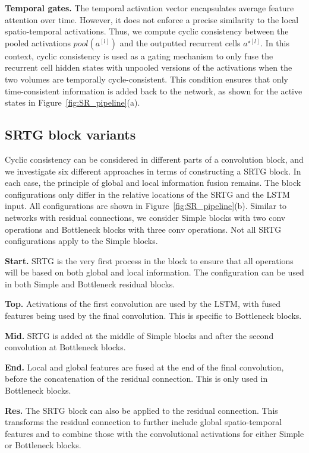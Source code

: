 \documentclass[final,5p,times,twocolumn]{elsarticle}
\begin{document}
\textbf{Temporal gates.} The temporal activation vector encapsulates average feature attention over time. However, it does not enforce a precise similarity to the local spatio-temporal activations. Thus, we compute cyclic consistency between the pooled activations $pool(a^{[l]})$ and the outputted recurrent cells $a^{\star[l]}$. In this context, cyclic consistency is used as a gating mechanism to only fuse the recurrent cell hidden states with unpooled versions of the activations when the two volumes are temporally cycle-consistent. This condition ensures that only time-consistent information is added back to the network, as shown for the active states in Figure~\ref{fig:SR_pipeline}(a).


\subsection{SRTG block variants}
\label{sec:Variants}

Cyclic consistency can be considered in different parts of a convolution block, and we investigate six different approaches in terms of constructing a SRTG block. In each case, the principle of global and local information fusion remains. The block configurations only differ in the relative locations of the SRTG and the LSTM input. All configurations are shown in Figure~\ref{fig:SR_pipeline}(b). Similar to networks with residual connections, we consider Simple blocks with two conv operations and Bottleneck blocks with three conv operations. Not all SRTG configurations apply to the Simple blocks.

\textbf{Start.} SRTG is the very first process in the block to ensure that all operations will be based on both global and local information. The configuration can be used in both Simple and Bottleneck residual blocks.

\textbf{Top.} Activations of the first convolution are used by the LSTM, with fused features being used by the final convolution. This is specific to Bottleneck blocks.

\textbf{Mid.} SRTG is added at the middle of Simple blocks and after the second convolution at Bottleneck blocks.

\textbf{End.} Local and global features are fused at the end of the final convolution, before the concatenation of the residual connection. This is only used in Bottleneck blocks.

\textbf{Res.} The SRTG block can also be applied to the residual connection. This transforms the residual connection to further include global spatio-temporal features and to combine those with the convolutional activations for either Simple or Bottleneck blocks.
\end{document}
